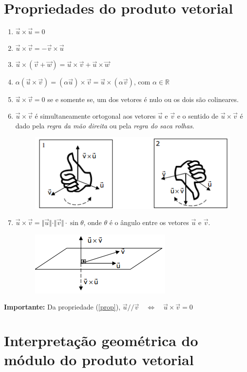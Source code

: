 \section{Propriedades do produto vetorial}
\begin{enumerate}[(1)]
 \item $\vec{u}\times \vec{u}=0$
 \item $\vec{u}\times \vec{v}=-\vec{v}\times \vec{u}$
 \item $\vec{u}\times (\vec{v}+\vec{w})=\vec{u}\times \vec{v}+\vec{u}\times \vec{w}$
 \item $\alpha (\vec{u}\times \vec{v})=(\alpha \vec{u})\times \vec{v}=\vec{u} \times (\alpha \vec{v})$, com $\alpha \in \mathbb{R}$
 \item $\vec{u}\times \vec{v}=0$ se e somente se, um dos vetores é nulo ou os dois são colineares.
 \item \label{prop}$\vec{u}\times \vec{v}$ é simultaneamente ortogonal aos vetores $\vec{u}$ e $\vec{v}$ e o sentido de $\vec{u}\times \vec{v}$ é  dado  pela  \textit{regra da mão direita} ou pela \textit{regra do saca rolhas}.
 \begin{figure}[H]
 \centering
 \includegraphics[width=0.4\linewidth]{analitica/imagens/rmd.png}
 \end{figure}
 
 \item $\vec{u} \times \vec{v} = \Vert \vec{u} \Vert \cdot \Vert \vec{v} \Vert \cdot \sin{\theta}$, onde $\theta$ é o ângulo entre os vetores $\vec{u}$ e $\vec{v}$.
\begin{figure}[H]
\centering
\includegraphics[width=0.4\linewidth]{analitica/imagens/prop.png}
\end{figure}
\end{enumerate}

\textbf{Importante:} Da propriedade (\ref{prop}), $\vec{u} // \vec{v} \quad \Leftrightarrow \quad \vec{u} \times \vec{v}=0$

\section{Interpretação geométrica do módulo do produto vetorial}

